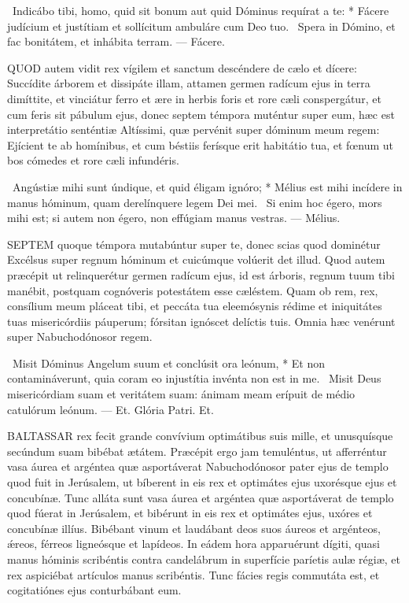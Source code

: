 \R\ Indicábo tibi, homo, quid sit bonum aut quid Dóminus requírat a te: * Fácere judícium et justítiam et sollícitum ambuláre cum Deo tuo. \V\ Spera in Dómino, et fac bonitátem, et inhábita terram. — Fácere.


\lettrine[lines=2]{Q}{UOD} autem vidit rex vígilem et sanctum descéndere de cælo et dícere: Succídite árborem et dissipáte illam, attamen germen radícum ejus in terra dimíttite, et vinciátur ferro et ære in herbis foris et rore cæli conspergátur, et cum feris sit pábulum ejus, donec septem témpora muténtur super eum, hæc est interpretátio senténtiæ Altíssimi, quæ pervénit super dóminum meum regem: Ejícient te ab homínibus, et cum béstiis ferísque erit habitátio tua, et fœnum ut bos cómedes et rore cæli infundéris.

\R\ Angústiæ mihi sunt úndique, et quid éligam ignóro; * Mélius est mihi incídere in manus hóminum, quam derelínquere legem Dei mei. \V\ Si enim hoc égero, mors mihi est; si autem non égero, non effúgiam manus vestras. — Mélius.



\lettrine[lines=2]{S}{EPTEM} quoque témpora mutabúntur super te, donec scias quod dominétur Excélsus super regnum hóminum et cuicúmque volúerit det illud. Quod autem præcépit ut relinquerétur germen radícum ejus, id est árboris, regnum tuum tibi manébit, postquam cognóveris potestátem esse cæléstem. Quam ob rem, rex, consílium meum pláceat tibi, et peccáta tua eleemósynis rédime et iniquitátes tuas misericórdiis páuperum; fórsitan ignóscet delíctis tuis. Omnia hæc venérunt super Nabuchodónosor regem.

\R\ Misit Dóminus Angelum suum et conclúsit ora leónum, * Et non contamináverunt, quia coram eo injustítia invénta non est in me. \V\ Misit Deus misericórdiam suam et veritátem suam: ánimam meam erípuit de médio catulórum leónum. — Et. Glória Patri. Et.




\lettrine[lines=2]{B}{ALTASSAR} rex fecit grande convívium optimátibus suis mille, et unusquísque secúndum suam bibébat ætátem. Præcépit ergo jam temuléntus, ut afferréntur vasa áurea et argéntea quæ asportáverat Nabuchodónosor pater ejus de templo quod fuit in Jerúsalem, ut bíberent in eis rex et optimátes ejus uxorésque ejus et concubínæ. Tunc alláta sunt vasa áurea et argéntea quæ asportáverat de templo quod fúerat in Jerúsalem, et bibérunt in eis rex et optimátes ejus, uxóres et concubínæ illíus. Bibébant vinum et laudábant deos suos áureos et argénteos, ǽreos, férreos ligneósque et lapídeos. In eádem hora apparuérunt dígiti, quasi manus hóminis scribéntis contra candelábrum in superfície paríetis aulæ régiæ, et rex aspiciébat artículos manus scribéntis. Tunc fácies regis commutáta est, et cogitatiónes ejus conturbábant eum.

